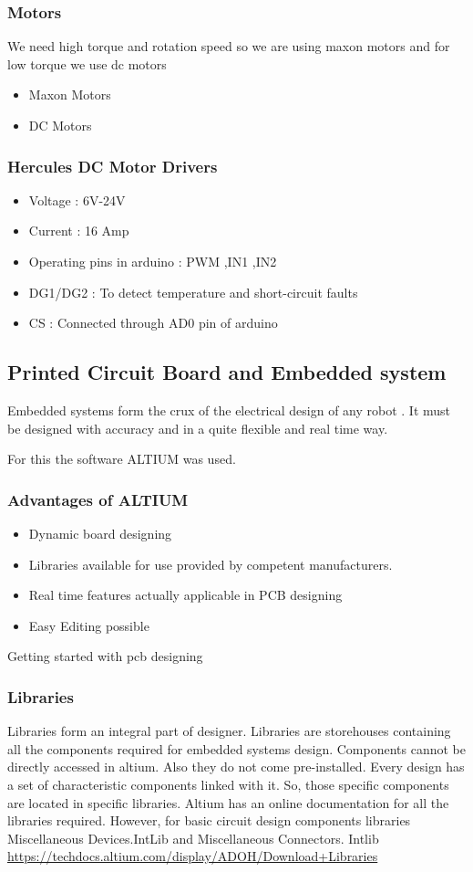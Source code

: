 \documentclass[11pt]{article}
\begin{document}
\subsubsection{Motors}
{We need high torque and rotation speed so we are using maxon motors and for low torque we use dc motors}
\begin{itemize}
\item{Maxon Motors}
\item{DC Motors}
\end{itemize}
\subsubsection{Hercules DC Motor Drivers}
\begin{itemize}
\item{Voltage : 6V-24V}
\item{Current : 16 Amp}
\item{Operating pins in arduino : PWM ,IN1 ,IN2}
\item{DG1/DG2 : To detect temperature and short-circuit faults}
\item{CS : Connected through AD0 pin of arduino}

\end{itemize}
\subsection{Printed Circuit Board and Embedded system}
Embedded systems form the crux of the electrical design of any robot . It must be designed with accuracy and in a quite flexible and real time way. 

For this the software ALTIUM was used.
\subsubsection{Advantages of ALTIUM}
\begin{itemize}
\item{Dynamic board designing} 
\item{Libraries available for use provided by competent manufacturers.}
\item{Real time features actually applicable in PCB designing}
\item{Easy Editing possible}
\end{itemize}
Getting started with pcb designing
\subsubsection{Libraries}
 Libraries form an integral part of designer. Libraries are storehouses containing all the components required for embedded systems design.
Components cannot be directly accessed in altium. Also they do not come pre-installed.
Every design has a set of characteristic components linked with it. So, those specific components are located in specific libraries.
Altium has an online documentation for all the libraries required. However, for basic circuit design components libraries Miscellaneous Devices.IntLib and Miscellaneous Connectors. Intlib         
\url {https://techdocs.altium.com/display/ADOH/Download+Libraries}
\end{document}
